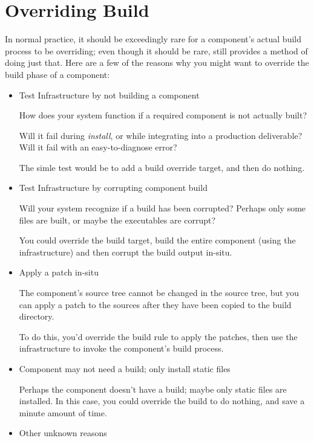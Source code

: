 \section{Overriding Build}

In normal practice, it should be exceedingly rare for a
component's actual build process to be overriding; even though it
should be rare, \lmsbw still provides a method of doing just that.
Here are a few of the reasons why you might want to override the build
phase of a component:

\begin{itemize}
\item Test \bni Infrastructure by not building a component

  How does your \bni system function if a required component is not
  actually built?

  Will it fail during \emph{install}, or while integrating into a
  production deliverable?  Will it fail with an easy-to-diagnose
  error?

  The simle test would be to add a build override target, and then do
  nothing.

\item Test \bni Infrastructure by corrupting component build

  Will your \bni system recognize if a build has been corrupted?
  Perhaps only some files are built, or maybe the executables are
  corrupt?

  You could override the build target, build the entire component
  (using the \lmsbw infrastructure) and then corrupt the build output
  in-situ.

\item Apply a patch in-situ

  The component's source tree cannot be changed in the source tree,
  but you can apply a patch to the sources after they have been copied to the build
  directory.

  To do this, you'd override the build rule to apply the patches, then
  use the \lmsbw infrastructure to invoke the component's build
  process.

\item Component may not need a build; only install static files

  Perhaps the component doesn't have a build; maybe only static files
  are installed.  In this case, you could override the build to do
  nothing, and save a minute amount of time.

\item Other unknown reasons
\end{itemize}

